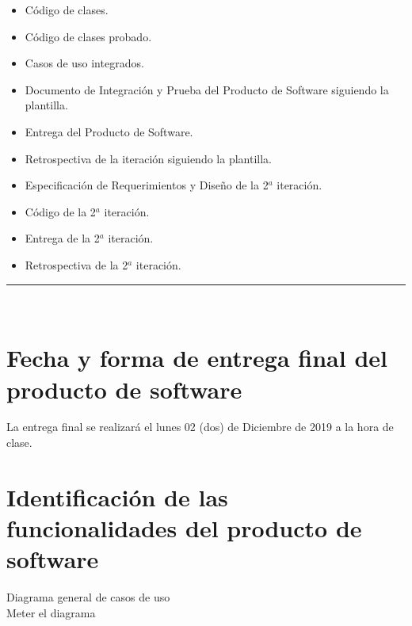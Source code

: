 \documentclass{article}
\begin{document}
\begin{itemize}
\item Código de clases.
\item Código de clases probado.
\item Casos de uso integrados.
\item Documento de Integración y Prueba del Producto de Software siguiendo la
  plantilla.
\item Entrega del Producto de Software.
\item Retrospectiva de la iteración siguiendo la plantilla.
\item Especificación de Requerimientos y Diseño de la 2$^{a}$ iteración.
\item Código de la 2$^{a}$ iteración.
\item Entrega de la 2$^{a}$ iteración.
\item Retrospectiva de la 2$^{a}$ iteración.
\end{itemize}
\rule{1\textwidth}{.8pt}\\

\section{Fecha y forma de entrega final del producto de software}
La entrega final se realizará el lunes 02 (dos) de Diciembre de 2019 a la hora de
clase.
\section{Identificación de las funcionalidades del producto de software}
Diagrama general de casos de uso\\
Meter el diagrama
\end{document}
